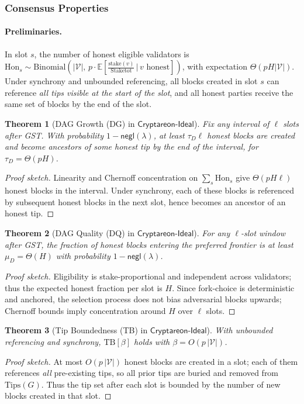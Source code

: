 \documentclass[11pt]{article}
\newtheorem{theorem}{Theorem}[section]
\newcommand{\ProjIdeal}{\ensuremath{\mathsf{Cryptareon\text{-}Ideal}}\xspace}
\newcommand{\negl}{\ensuremath{\mathsf{negl}}\xspace}
\newcommand{\Val}{\ensuremath{\mathcal{V}}\xspace}
\newcommand{\stake}{\ensuremath{\mathrm{stake}}\xspace}
\newcommand{\StakeTot}{\ensuremath{\mathrm{Stake}{\mathrm{tot}}}\xspace}
\newcommand{\stakefrac}[1]{\ensuremath{\frac{\stake(#1)}{\StakeTot}}\xspace}
\newcommand{\Tips}{\ensuremath{\mathrm{Tips}}\xspace}
\begin{document}
\subsubsection{Consensus Properties}

\paragraph{Preliminaries.} In slot $s$, the number of honest eligible validators is $\mathrm{Hon}_s\sim \mathrm{Binomial}(|\Val|,\,p\cdot \mathbb{E}[\stakefrac{v}\,|\,v\text{ honest}])$, with expectation $\Theta(pH|\Val|)$. Under synchrony and unbounded referencing, all blocks created in slot $s$ can reference \emph{all tips visible at the start of the slot}, and all honest parties receive the same set of blocks by the end of the slot.

\begin{theorem}[DAG Growth (DG) in \ProjIdeal]
\label{thm:ideal-DG}
Fix any interval of $\ell$ slots after GST. With probability $1-\negl(\lambda)$, at least $\tau_D\ell$ honest blocks are created and become ancestors of some honest tip by the end of the interval, for $\tau_D=\Theta(pH)$.
\end{theorem}
\begin{proof}[Proof sketch]
Linearity and Chernoff concentration on $\sum_{s} \mathrm{Hon}_s$ give $\Theta(pH\ell)$ honest blocks in the interval. Under synchrony, each of these blocks is referenced by subsequent honest blocks in the next slot, hence becomes an ancestor of an honest tip.
\end{proof}

\begin{theorem}[DAG Quality (DQ) in \ProjIdeal]
\label{thm:ideal-DQ}
For any $\ell$-slot window after GST, the fraction of honest blocks entering the preferred frontier is at least $\mu_D=\Theta(H)$ with probability $1-\negl(\lambda)$.
\end{theorem}
\begin{proof}[Proof sketch]
Eligibility is stake-proportional and independent across validators; thus the expected honest fraction per slot is $H$. Since fork-choice is deterministic and anchored, the selection process does not bias adversarial blocks upwards; Chernoff bounds imply concentration around $H$ over $\ell$ slots.
\end{proof}

\begin{theorem}[Tip Boundedness (TB) in \ProjIdeal]
\label{thm:ideal-TB}
With unbounded referencing and synchrony, $\mathrm{TB}[\beta]$ holds with $\beta=O(p\,|\Val|)$.
\end{theorem}
\begin{proof}[Proof sketch]
At most $O(p\,|\Val|)$ honest blocks are created in a slot; each of them references \emph{all} pre-existing tips, so all prior tips are buried and removed from $\Tips(G)$. Thus the tip set after each slot is bounded by the number of new blocks created in that slot.
\end{proof}
\end{document}
